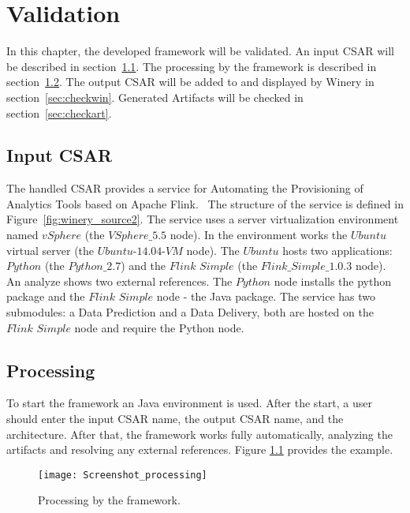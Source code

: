 
\chapter{Validation}\label{chap:check}
In this chapter, the developed framework will be validated.
An input CSAR will be described in section~\ref{sec:inputcsar}.
The processing by the framework is described in section~\ref{sec:process}.
The output CSAR will be added to and displayed by Winery in section~\ref{sec:checkwin}.
Generated Artifacts will be checked in section~\ref{sec:checkart}.

\section{Input CSAR}\label{sec:inputcsar}
The handled CSAR provides a service for Automating the Provisioning of Analytics Tools based on Apache Flink.~\cite{csar_test}
The structure of the service is defined in Figure~\ref{fig:winery_source2}. 
The service uses a server virtualization environment named $vSphere$ (the $VSphere\_5.5$ node). 
In the environment works the $Ubuntu$ virtual server (the $Ubuntu$-$14.04$-$VM$ node).
The $Ubuntu$ hosts two applications: $Python$ (the $Python\_2.7$) and the $Flink$ $Simple$ (the $Flink\_Simple\_1.0.3$ node).
An analyze shows two external references. The $Python$ node installs the python package and the $Flink$ $Simple$ node - the Java package.
The service has two submodules: a Data Prediction and a Data Delivery, both are hosted on the $Flink$ $Simple$ node and require the Python node. 

\section{Processing}\label{sec:process}
To start the framework an Java environment is used.
After the start, a user should enter the input CSAR name, the output CSAR name, and the architecture.
After that, the framework works fully automatically, analyzing the artifacts and resolving any external references.
Figure \ref{fig:process} provides the example.
\begin{figure}[ht]   
	\centering
	\texttt{[image: Screenshot\_processing]}
	\caption{Processing by the framework.}
	\label{fig:process}
\end{figure}

